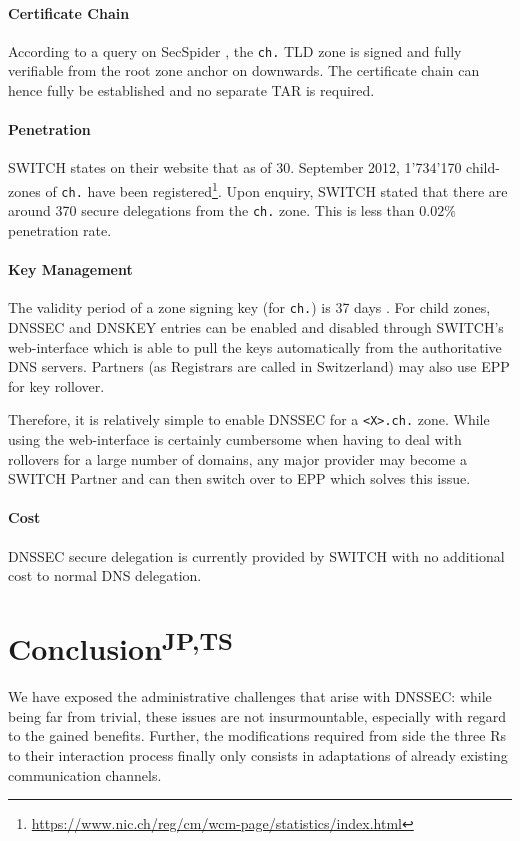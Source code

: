 \documentclass[a4paper,twocolumn]{scrartcl}
\newcommand{\wbjpts}{\textsuperscript{JP,TS}}
\begin{document}
\paragraph{Certificate Chain} According to a query on SecSpider
\cite{secspider}, the \verb|ch.| TLD zone is signed and fully
verifiable from the root zone anchor on downwards. The certificate
chain can hence fully be established and no separate TAR is required.

\paragraph{Penetration} SWITCH states on their website that as of
30. September 2012, 1'734'170 child-zones of \verb|ch.| have been
registered\footnote{\url{https://www.nic.ch/reg/cm/wcm-page/statistics/index.html}}. Upon
enquiry, SWITCH stated that there are around 370 secure delegations
from the \verb|ch.| zone. This is less than $0.02\%$ penetration
rate.

\paragraph{Key Management} The validity period of a zone signing key
(for \verb|ch.|) is 37 days \cite{switch10}. For child zones,  DNSSEC
and DNSKEY entries can be enabled and disabled through SWITCH's 
web-interface which is able to pull the keys automatically from the
authoritative DNS servers. Partners (as Registrars are called in
Switzerland) may also use EPP for key rollover.

Therefore, it is relatively simple to enable DNSSEC for a \verb|<X>.ch.| 
zone. While using the web-interface is certainly cumbersome when
having to deal with rollovers for a large number of domains, any major
provider may become a SWITCH Partner and can then switch over to EPP
which solves this issue.


\paragraph{Cost} DNSSEC secure delegation is currently provided by
SWITCH with no additional cost to normal DNS delegation.

\section{Conclusion\wbjpts}
We have exposed the administrative challenges that arise with DNSSEC:
while being far from trivial, these issues are not insurmountable,
especially with regard to the gained benefits. Further, the
modifications required from side the three Rs to their interaction
process finally only consists in adaptations of already existing
communication channels.
\end{document}
